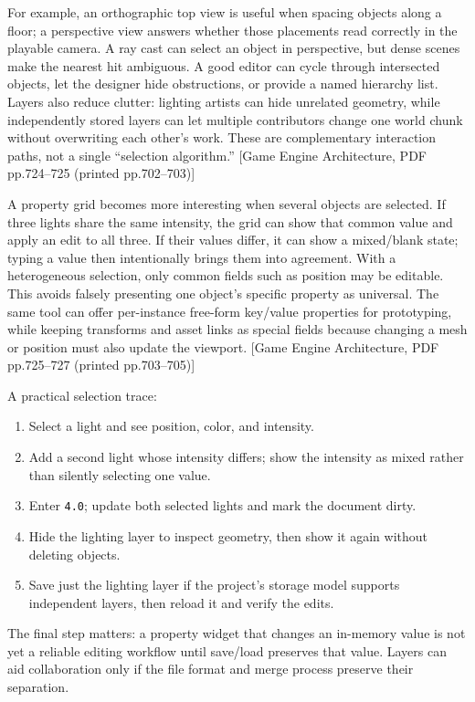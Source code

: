 For example, an orthographic top view is useful when spacing objects along a floor; a perspective view answers whether those placements read correctly in the playable camera. A ray cast can select an object in perspective, but dense scenes make the nearest hit ambiguous. A good editor can cycle through intersected objects, let the designer hide obstructions, or provide a named hierarchy list. Layers also reduce clutter: lighting artists can hide unrelated geometry, while independently stored layers can let multiple contributors change one world chunk without overwriting each other's work. These are complementary interaction paths, not a single ``selection algorithm.'' {[}Game Engine Architecture, PDF pp.724--725 (printed pp.702--703){]}

A property grid becomes more interesting when several objects are selected. If three lights share the same intensity, the grid can show that common value and apply an edit to all three. If their values differ, it can show a mixed/blank state; typing a value then intentionally brings them into agreement. With a heterogeneous selection, only common fields such as position may be editable. This avoids falsely presenting one object's specific property as universal. The same tool can offer per-instance free-form key/value properties for prototyping, while keeping transforms and asset links as special fields because changing a mesh or position must also update the viewport. {[}Game Engine Architecture, PDF pp.725--727 (printed pp.703--705){]}

A practical selection trace:

\begin{enumerate}
\def\labelenumi{\arabic{enumi}.}
\tightlist
\item
  Select a light and see position, color, and intensity.
\item
  Add a second light whose intensity differs; show the intensity as mixed rather than silently selecting one value.
\item
  Enter \texttt{4.0}; update both selected lights and mark the document dirty.
\item
  Hide the lighting layer to inspect geometry, then show it again without deleting objects.
\item
  Save just the lighting layer if the project's storage model supports independent layers, then reload it and verify the edits.
\end{enumerate}

The final step matters: a property widget that changes an in-memory value is not yet a reliable editing workflow until save/load preserves that value. Layers can aid collaboration only if the file format and merge process preserve their separation.

